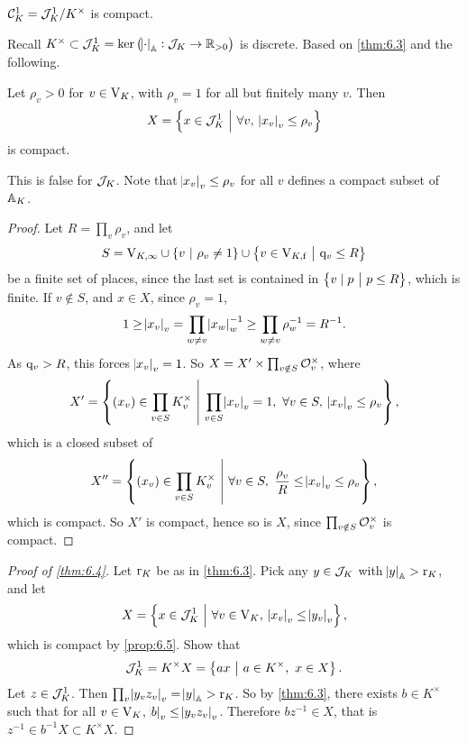 \begin{theorem}
\label{thm:6.4}
$ \CCC_K^1 = \JJJ_K^1 / K^\times $ is compact.
\end{theorem}

Recall $ K^\times \subset \JJJ_K^1 = \ker \br{\abs{\cdot}_\AA : \JJJ_K \to \RR_{> 0}} $ is discrete. Based on \ref{thm:6.3} and the following.

\begin{proposition}
\label{prop:6.5}
Let $ \rho_v > 0 $ for $ v \in \V_K $, with $ \rho_v = 1 $ for all but finitely many $ v $. Then
$$ X = \cbr{x \in \JJJ_K^1 \st \forall v, \ \abs{x_v}_v \le \rho_v} $$
is compact.
\end{proposition}

This is false for $ \JJJ_K $. Note that $ \abs{x_v}_v \le \rho_v $ for all $ v $ defines a compact subset of $ \AA_K $.

\begin{proof}
Let $ R = \prod_v \rho_v $, and let
$$ S = \V_{K, \infty} \cup \cbr{v \st \rho_v \ne 1} \cup \cbr{v \in \V_{K, \f} \st \q_v \le R} $$
be a finite set of places, since the last set is contained in $ \cbr{v \mid p \st p \le R} $, which is finite. If $ v \notin S $, and $ x \in X $, since $ \rho_v = 1 $,
$$ 1 \ge \abs{x_v}_v = \prod_{w \ne v} \abs{x_w}_w^{-1} \ge \prod_{w \ne v} \rho_w^{-1} = R^{-1}. $$
As $ \q_v > R $, this forces $ \abs{x_v}_v = 1 $. So $ X = X' \times \prod_{v \notin S} \OOO_v^\times $, where
$$ X' = \cbr{\br{x_v} \in \prod_{v \in S} K_v^\times \st \prod_{v \in S} \abs{x_v}_v = 1, \ \forall v \in S, \ \abs{x_v}_v \le \rho_v}, $$
which is a closed subset of
$$ X'' = \cbr{\br{x_v} \in \prod_{v \in S} K_v^\times \st \forall v \in S, \ \dfrac{\rho_v}{R} \le \abs{x_v}_v \le \rho_v}, $$
which is compact. So $ X' $ is compact, hence so is $ X $, since $ \prod_{v \notin S} \OOO_v^\times $ is compact.
\end{proof}

\begin{proof}[Proof of \ref{thm:6.4}]
Let $ \r_K $ be as in \ref{thm:6.3}. Pick any $ y \in \JJJ_K $ with $ \abs{y}_\AA > \r_K $, and let
$$ X = \cbr{x \in \JJJ_K^1 \st \forall v \in \V_K, \ \abs{x_v}_v \le \abs{y_v}_v}, $$
which is compact by \ref{prop:6.5}. Show that
$$ \JJJ_K^1 = K^\times X = \cbr{ax \st a \in K^\times, \ x \in X}. $$
Let $ z \in \JJJ_K^1 $. Then $ \prod_v \abs{y_vz_v}_v = \abs{y}_\AA > \r_K $. So by \ref{thm:6.3}, there exists $ b \in K^\times $ such that for all $ v \in \V_K $, $ \abs{b}_v \le \abs{y_vz_v}_v $. Therefore $ bz^{-1} \in X $, that is $ z^{-1} \in b^{-1}X \subset K^\times X $.
\end{proof}

